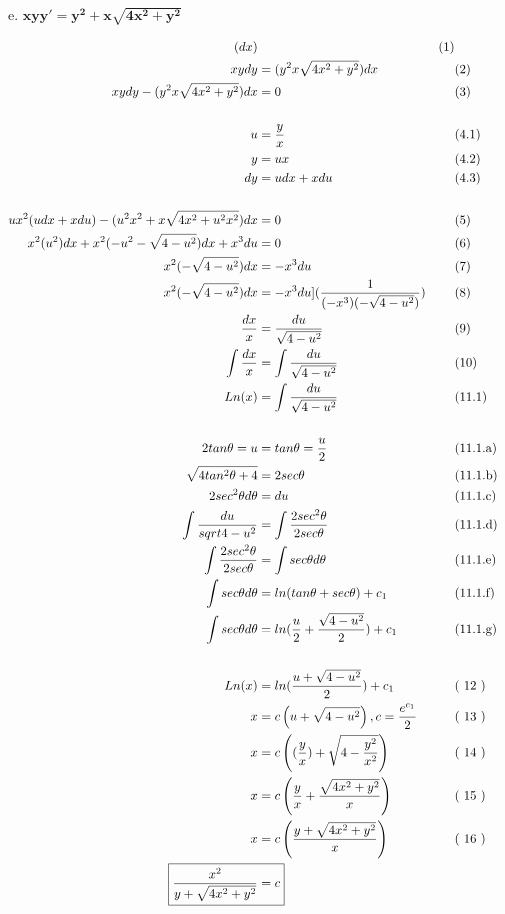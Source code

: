 \documentclass{article}
\newcommand{\newLine}[3]{ #1 & = #2 && \text{(#3)}\\ }
\newcommand{\finalAnswer}[2]{ \Aboxed{ #1 & = #2 } }
\newcommand{\p}[1]{ \left( #1 \right) }
\begin{document}
\begin{flushleft}
        \hspace{10mm} e. $
            \boldsymbol{ xyy' = y^2 + x\sqrt{4x^2 + y^2} }
            $  \break

            \begin{align*}
                \newLine{[ xy\frac{dy}{dx}} {y^2 x\sqrt{ 4x^2 + y^2} ] (dx) } {1}
                \newLine{xydy} {(y^2 x\sqrt{ 4x^2 + y^2})dx} {2}
                \newLine{xydy - (y^2 x\sqrt{ 4x^2 + y^2})dx } {0} {3}
                \\
                \newLine{u}{\frac{y}{x}}{4.1}
                \newLine{y}{ux}{4.2}
                \newLine{dy}{udx+xdu}{4.3}
                \\
                \newLine{ux^2 (udx + xdu) - (u^2 x^2 + x \sqrt{4x^2 + u^2 x^2})dx}{0}{5}
                \newLine{ x^2(u^2)dx + x^2(-u^2 - \sqrt{4-u^2})dx + x^3du }{0}{6}
                \newLine{ x^2(-\sqrt{4-u^2})dx }{-x^3du}{7}
                \newLine{ x^2(-\sqrt{4-u^2})dx }{-x^3du ] (\frac{1}{(-x^3)(-\sqrt{4-u^2})})}{8}
                \newLine{ \frac{dx}{x} }{ \frac{du}{ \sqrt{4-u^2}} }{9}
                \newLine{\int \frac{dx}{x} }{ \int \frac{du}{ \sqrt{4-u^2}} }{10}
                \newLine{ Ln(x) }{ \int \frac{du}{ \sqrt{4-u^2}} }{11.1}
                \\
                \newLine{2tan\theta = u}{ tan\theta = \frac{u}{2} }{11.1.a}
                \newLine{\sqrt{ 4tan^{2}\theta +4 }}{2sec\theta}{11.1.b}
                \newLine{2sec^{2}\theta d\theta}{du}{11.1.c}
                \newLine{ \int \frac{du}{sqrt{4-u^2}} } { \int \frac{ 2sec^{2}\theta }{ 2sec\theta } } {11.1.d}
                \newLine{ \int \frac{ 2sec^{2}\theta }{ 2sec\theta } } { \int sec\theta d\theta } {11.1.e}
                \newLine{ \int sec\theta d\theta } { ln(tan\theta + sec\theta) + c_1 } {11.1.f}
                \newLine{ \int sec\theta d\theta } { ln( \frac{u}{2} + \frac{ \sqrt{4-u^2} }{2} ) + c_1 } {11.1.g}
                \\
                \newLine{ Ln(x) } { ln( \frac{u + \sqrt{4-u^2} }{2} ) + c_1 } { 12 }
                \newLine{ x } { c \left( u + \sqrt{4-u^2}  \right), c=\frac{e^{c_1}}{2} } { 13 }
                \newLine{ x } { c \left( (\frac{y}{x}) + \sqrt{4-\frac{y^2}{x^2}} \right)  } { 14 }
                \newLine{ x } { c \p{ \frac{y}{x} + \frac{ \sqrt{4x^2 + y^2} }{x} } } { 15 }
                \newLine{ x } { c \p{ \frac{y + \sqrt{4x^2 + y^2} }{x} } } { 16 }
                \finalAnswer{ \frac{ x^2 }{ y + \sqrt{4x^2 + y^2} } }{c}
            \end{align*}


\end{flushleft}
\end{document}
